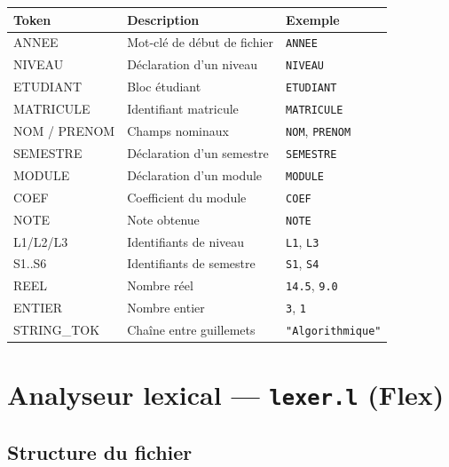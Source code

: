 \documentclass[10pt,a4paper]{article}
\begin{document}
\begin{center}
\begin{tabularx}{0.95\linewidth}{>{\ttfamily}l l l}
\toprule
\normalfont\textbf{Token} & \textbf{Description} & \textbf{Exemple} \\
\midrule
ANNEE      & Mot-clé de début de fichier    & \texttt{ANNEE}             \\
NIVEAU     & Déclaration d'un niveau        & \texttt{NIVEAU}            \\
ETUDIANT   & Bloc étudiant                  & \texttt{ETUDIANT}          \\
MATRICULE  & Identifiant matricule          & \texttt{MATRICULE}         \\
NOM / PRENOM & Champs nominaux             & \texttt{NOM}, \texttt{PRENOM} \\
SEMESTRE   & Déclaration d'un semestre      & \texttt{SEMESTRE}          \\
MODULE     & Déclaration d'un module        & \texttt{MODULE}            \\
COEF       & Coefficient du module          & \texttt{COEF}              \\
NOTE       & Note obtenue                   & \texttt{NOTE}              \\
L1/L2/L3   & Identifiants de niveau         & \texttt{L1}, \texttt{L3}   \\
S1..S6     & Identifiants de semestre       & \texttt{S1}, \texttt{S4}   \\
REEL       & Nombre réel                    & \texttt{14.5}, \texttt{9.0}\\
ENTIER     & Nombre entier                  & \texttt{3}, \texttt{1}     \\
STRING\_TOK & Chaîne entre guillemets       & \texttt{"Algorithmique"}   \\
\bottomrule
\end{tabularx}
\end{center}

\section{Analyseur lexical --- \texttt{lexer.l} (Flex)}

\subsection{Structure du fichier}
\end{document}
